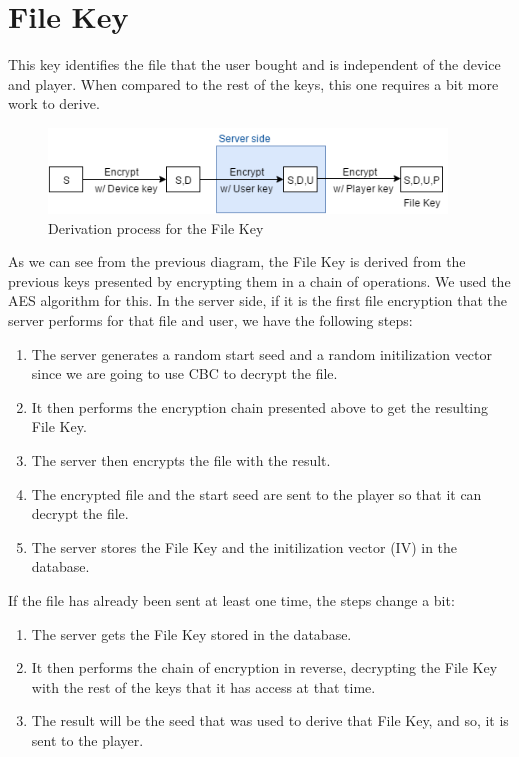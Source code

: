 \documentclass[11pt,a4paper]{report}
\begin{document}
\section{File Key}
This key identifies the file that the user bought and is independent of the device and player. When compared to the rest of the keys, this one requires a bit more work to derive.

\begin{figure}[H]
\centerline{\includegraphics[width=300pt]{images/fileKey.png}}
\caption{Derivation process for the File Key}
\label{fileKey}
\end{figure}

As we can see from the previous diagram, the File Key is derived from the previous keys presented by encrypting them in a chain of operations.
We used the AES algorithm for this.
\newline In the server side, if it is the first file encryption that the server performs for that file and user, we have the following steps:
\begin{enumerate}
  \item The server generates a random start seed and a random initilization vector since we are going to use CBC to decrypt the file.
  \item It then performs the encryption chain presented above to get the resulting File Key.
  \item The server then encrypts the file with the result.
  \item The encrypted file and the start seed are sent to the player so that it can decrypt the file.
  \item The server stores the File Key and the initilization vector (IV) in the database.
\end{enumerate}

If the file has already been sent at least one time, the steps change a bit:
\begin{enumerate}
  \item The server gets the File Key stored in the database.
  \item It then performs the chain of encryption in reverse, decrypting the File Key with the rest of the keys that it has access at that time.
  \item The result will be the seed that was used to derive that File Key, and so, it is sent to the player.
\end{enumerate}
\end{document}
